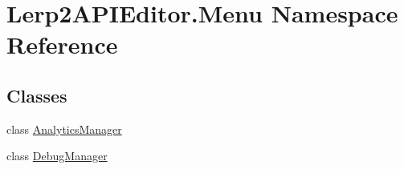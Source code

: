 \hypertarget{namespace_lerp2_a_p_i_editor_1_1_menu}{}\section{Lerp2\+A\+P\+I\+Editor.\+Menu Namespace Reference}
\label{namespace_lerp2_a_p_i_editor_1_1_menu}
\subsection*{Classes}
\begin{DoxyCompactItemize}
\item 
class \hyperlink{class_lerp2_a_p_i_editor_1_1_menu_1_1_analytics_manager}{Analytics\+Manager}
\item 
class \hyperlink{class_lerp2_a_p_i_editor_1_1_menu_1_1_debug_manager}{Debug\+Manager}
\end{DoxyCompactItemize}
